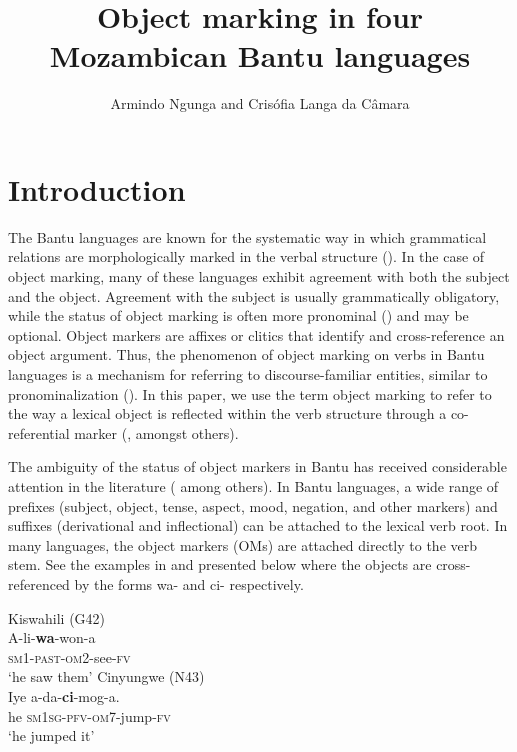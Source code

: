 \documentclass[output=paper]{langscibook}
\author{Armindo Ngunga\orcid{}\affiliation{Centro de Estudos Africanos Universidade Eduardo Mondlane} and
        Crisófia Langa da Câmara\orcid{}\affiliation{Centro de Estudos Africanos Universidade Eduardo Mondlane}}
\title{Object marking in four Mozambican Bantu languages}
\begin{document}
\maketitle 

\settowidth\jamwidth{[OM-V] [O]}

\section{Introduction}

The Bantu languages are known for the systematic way in which grammatical relations are morphologically marked in the verbal structure (\citet{Ngunga2014}). In the case of object marking, many of these languages exhibit agreement with both the subject and the object. Agreement with the subject is usually grammatically obligatory, while the status of object marking is often more pronominal (\citealt{MartenRamadhani2001}) and may be optional. Object markers are affixes or clitics that identify and cross-reference an object argument. Thus, the phenomenon of object marking on verbs in Bantu languages is a mechanism for referring to discourse-familiar entities, similar to pronominalization (\citealt{SikukuEtAl2018}). In this paper, we use the term object marking to refer to the way a lexical object is reflected within the verb structure through a co-referential marker (\citealt{Baker1988, Corbett2006, Deen2006}, amongst others).

The ambiguity of the status of object markers in Bantu has received considerable attention in the literature (\citealt{MartenKula2012, Riedel2009, RiedelMarten2012preface, Zeller2014} among others). In Bantu languages, a wide range of prefixes (subject, object, tense, aspect, mood, negation, and other markers) and suffixes (derivational and inflectional) can be attached to the lexical verb root. In many languages, the object markers (OMs) are attached directly to the verb stem. See the examples in  and  presented below where the objects are cross-referenced by the forms wa- and ci- respectively.

\ea\label{ex:ngunga:1} Kiswahili (G42)  \citep[46]{Riedel2009}\\
\gll A-li-\textbf{wa}{}-won-a\\
    \textsc{sm}1-\textsc{past}-\textsc{om}2-see-\textsc{fv}\\
\glt ‘he saw them’
\ex\label{ex:ngunga:2}Cinyungwe   (N43)\\
\gll Iye  a-da-\textbf{ci}{}-mog-a.\\
     he  \textsc{sm1sg}{}-\textsc{pfv}-\textsc{om}7-jump-\textsc{fv}\\
\glt ‘he jumped it’
\z
\end{document}
